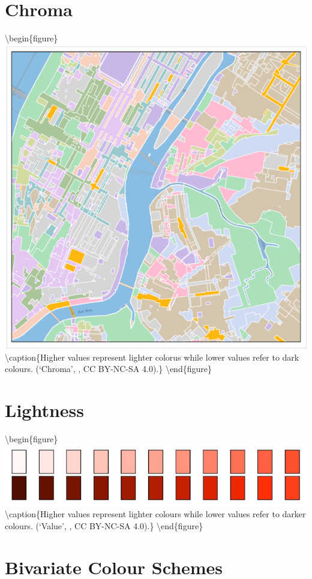 \documentclass[
]{book}
\begin{document}
\hypertarget{chroma}{%
\section{Chroma}\label{chroma}}

\textbackslash begin\{figure\}
\includegraphics[width=0.8\linewidth]{images/17-chroma} \textbackslash caption\{Higher values represent lighter colorus while lower values refer to dark colours. (`Chroma', \citet{anderson_chroma_2020}, CC BY-NC-SA 4.0).\}\label{fig:17-chroma}
\textbackslash end\{figure\}

\hypertarget{lightness}{%
\section{Lightness}\label{lightness}}

\textbackslash begin\{figure\}
\includegraphics[width=0.8\linewidth]{images/17-lightness} \textbackslash caption\{Higher values represent lighter colours while lower values refer to darker colours. (`Value', \citet{manson_value_2013}, CC BY-NC-SA 4.0).\}\label{fig:17-lightness}
\textbackslash end\{figure\}

\hypertarget{bivariate-colour-schemes}{%
\section{Bivariate Colour Schemes}\label{bivariate-colour-schemes}}
\end{document}
